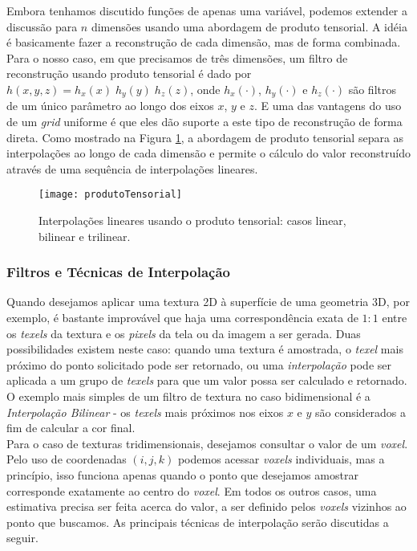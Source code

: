 Embora tenhamos discutido funções de apenas uma variável, podemos extender a discussão para $n$ dimensões usando uma abordagem de produto tensorial. A idéia é basicamente fazer a reconstrução de cada dimensão, mas de forma combinada. Para o nosso caso, em que precisamos de três dimensões, um filtro de reconstrução usando produto tensorial é dado por $h(x,y,z) = h_{x}(x)\;h_{y}(y)\;h_{z}(z)$, onde $h_{x}(\cdotp)$, $h_{y}(\cdotp)$ e $h_{z}(\cdotp)$ são filtros de um único parâmetro ao longo dos eixos $x$, $y$ e $z$. E uma das vantagens do uso de um \emph{grid} uniforme é que eles dão suporte a este tipo de reconstrução de forma direta. Como mostrado na Figura \ref{produtoTensorial}, a abordagem de produto tensorial separa as interpolações ao longo de cada dimensão e permite o cálculo do valor reconstruído através de uma sequência de interpolações lineares.

\begin{figure}[!htb]
\center
\texttt{[image: produtoTensorial]}
\caption{Interpolações lineares usando o produto tensorial: casos linear, bilinear e trilinear.}
\label{produtoTensorial}
\end{figure}

\subsubsection{Filtros e Técnicas de Interpolação}

Quando desejamos aplicar uma textura 2D à superfície de uma geometria 3D, por exemplo, é bastante improvável que haja uma correspondência exata de $1:1$ entre os {\it texels} da textura e os {\it pixels} da tela ou da imagem a ser gerada. Duas possibilidades existem neste caso: quando uma textura é amostrada, o {\it texel} mais próximo do ponto solicitado pode ser retornado, ou uma \emph{interpolação} pode ser aplicada a um grupo de {\it texels} para que um valor possa ser calculado e retornado. \\

O exemplo mais simples de um filtro de textura no caso bidimensional é a \emph{Interpolação Bilinear} - os {\it texels} mais próximos nos eixos $x$ e $y$ são considerados a fim de calcular a cor final. \\

Para o caso de texturas tridimensionais, desejamos consultar o valor de um {\it voxel}. Pelo uso de coordenadas $(i, j, k)$ podemos acessar {\it voxels} individuais, mas a princípio, isso funciona apenas quando o ponto que desejamos amostrar corresponde exatamente ao centro do {\it voxel}. Em todos os outros casos, uma estimativa precisa ser feita acerca do valor, a ser definido pelos {\it voxels} vizinhos ao ponto que buscamos. As principais técnicas de interpolação serão discutidas a seguir. \\

